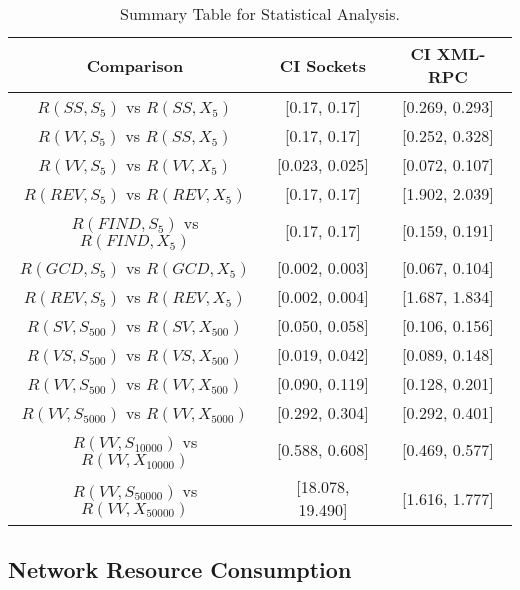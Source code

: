 \documentclass{sig-alternate}
\begin{document}
\begin{table*}[t]

\begin{center}
\begin{tabular}{|c||c|c|}

\hline
 {\bf Comparison}     &{\bf CI Sockets}     &{\bf CI XML-RPC} \\
\hline
 $R(SS,S_{5})$ vs $ R(SS,X_{5})$  & [0.17, 0.17]   & [0.269, 0.293] \\
\hline
 $R(VV,S_{5})$ vs $R(SS,X_{5})$   & [0.17, 0.17]   & [0.252, 0.328] \\
\hline
 $R(VV,S_{5})$ vs $R(VV,X_{5})$  & [0.023, 0.025]   & [0.072, 0.107] \\
\hline
 $R(REV,S_{5})$ vs $R(REV,X_{5})$  & [0.17, 0.17]   & [1.902, 2.039] \\
\hline
 $R(FIND,S_{5})$ vs $R(FIND,X_{5})$ & [0.17, 0.17]   & [0.159, 0.191] \\
\hline
 $R(GCD,S_{5})$ vs $R(GCD,X_{5})$  & [0.002, 0.003]   & [0.067, 0.104] \\
\hline
 $R(REV,S_{5})$ vs $R(REV,X_{5})$& [0.002, 0.004]   & [1.687, 1.834] \\
\hline
 $R(SV,S_{500})$ vs $R(SV,X_{500})$& [0.050, 0.058]   & [0.106, 0.156] \\
\hline
 $R(VS,S_{500})$ vs $R(VS,X_{500})$& [0.019, 0.042]   & [0.089, 0.148] \\
\hline
 $R(VV,S_{500})$ vs $R(VV,X_{500})$ & [0.090, 0.119]   & [0.128, 0.201] \\
\hline
 $R(VV,S_{5000})$ vs $R(VV,X_{5000})$   & [0.292, 0.304] & [0.292, 0.401] \\
\hline
 $ R(VV,S_{10000})$ vs $ R(VV,X_{10000})$   & [0.588, 0.608] & [0.469, 0.577] \\
\hline
 $ R(VV,S_{50000})$ vs $ R(VV,X_{50000})$  & [18.078, 19.490]  & [1.616, 1.777] \\

\hline
\end{tabular}
\end{center}

\vspace*{-.15in}

\caption{Summary Table for Statistical Analysis.}
\label{tab:XMLResults}

\vspace*{-.1in}

\end{table*}

\subsection{Network Resource Consumption}
\label{sec:space}
\end{document}
